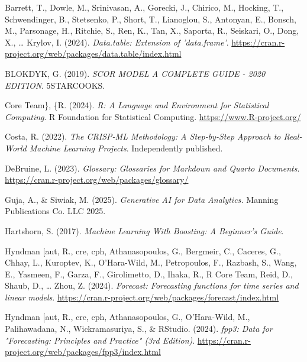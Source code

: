\documentclass[
  american,
  10,
  a4paper,
]{book}
\newlength{\cslhangindent}
\newenvironment{CSLReferences}[2] %
 {\begin{list}{}{%
  \setlength{\itemindent}{0pt}
  \setlength{\leftmargin}{0pt}
  \setlength{\parsep}{0pt}
  \ifodd #1
   \setlength{\leftmargin}{\cslhangindent}
   \setlength{\itemindent}{-1\cslhangindent}
  \fi
  \setlength{\itemsep}{#2\baselineskip}}}
 {\end{list}}
\theoremstyle{definition}
\theoremstyle{remark}
\begin{document}
\label{refs}
\begin{CSLReferences}{1}{0}
Barrett, T., Dowle, M., Srinivasan, A., Gorecki, J., Chirico, M.,
Hocking, T., Schwendinger, B., Stetsenko, P., Short, T., Lianoglou, S.,
Antonyan, E., Bonsch, M., Parsonage, H., Ritchie, S., Ren, K., Tan, X.,
Saporta, R., Seiskari, O., Dong, X., \ldots{} Krylov, I. (2024).
\emph{Data.table: {Extension} of 'data.frame'}.
\url{https://cran.r-project.org/web/packages/data.table/index.html}

BLOKDYK, G. (2019). \emph{{SCOR} {MODEL} {A} {COMPLETE} {GUIDE} - 2020
{EDITION}}. 5STARCOOKS.

Core Team\}, \{R. (2024). \emph{R: {A} {Language} and {Environment} for
{Statistical} {Computing}}. R Foundation for Statistical Computing.
\url{https://www.R-project.org/}

Costa, R. (2022). \emph{The {CRISP}-{ML} {Methodology}: {A}
{Step}-by-{Step} {Approach} to {Real}-{World} {Machine} {Learning}
{Projects}}. Independently published.

DeBruine, L. (2023). \emph{Glossary: {Glossaries} for {Markdown} and
{Quarto} {Documents}}.
\url{https://cran.r-project.org/web/packages/glossary/}

Guja, A., \& Siwiak, M. (2025). \emph{Generative {AI} for {Data}
{Analytics}.} Manning Publications Co. LLC 2025.

Hartshorn, S. (2017). \emph{Machine {Learning} {With} {Boosting}: {A}
{Beginner}'s {Guide}}.

Hyndman {[}aut, R., cre, cph, Athanasopoulos, G., Bergmeir, C., Caceres,
G., Chhay, L., Kuroptev, K., O'Hara-Wild, M., Petropoulos, F., Razbash,
S., Wang, E., Yasmeen, F., Garza, F., Girolimetto, D., Ihaka, R., R Core
Team, Reid, D., Shaub, D., \ldots{} Zhou, Z. (2024). \emph{Forecast:
Forecasting functions for time series and linear models}.
\url{https://cran.r-project.org/web/packages/forecast/index.html}

Hyndman {[}aut, R., cre, cph, Athanasopoulos, G., O'Hara-Wild, M.,
Palihawadana, N., Wickramasuriya, S., \& RStudio. (2024). \emph{fpp3:
{Data} for "{Forecasting}: {Principles} and {Practice}" (3rd
{Edition})}.
\url{https://cran.r-project.org/web/packages/fpp3/index.html}


\end{CSLReferences}
\end{document}
